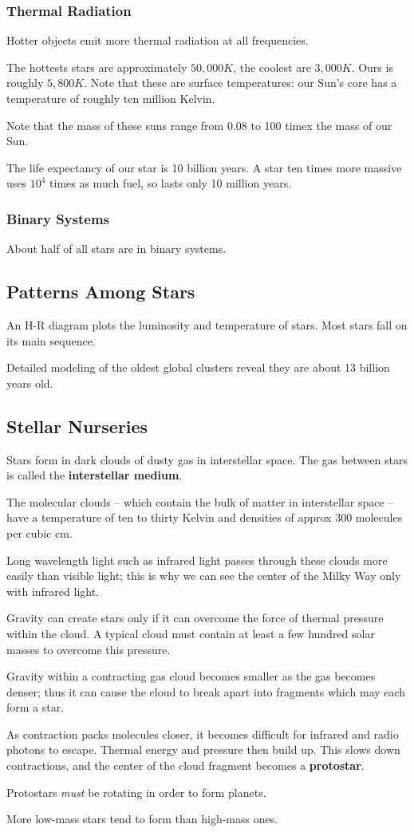 \documentclass[12pt]{article}
\begin{document}
\subsubsection{Thermal Radiation}
Hotter objects emit more thermal radiation at all frequencies.

The hottests stars are approximately $50,000K$, the coolest are $3,000K$. Ours is roughly $5,800K$. Note that these are surface temperatures: our Sun's core has a temperature of roughly ten million Kelvin.

Note that the mass of these suns range from 0.08 to 100 timex the mass of our Sun.

The life expectancy of our star is 10 billion years. A star ten times more massive uses $10^4$ times as much fuel, so lasts only 10 million years.

\subsubsection{Binary Systems}
About half of all stars are in binary systems.

\subsection{Patterns Among Stars}
An H-R diagram plots the luminosity and temperature of stars. Most stars fall on its main sequence.

Detailed modeling of the oldest global clusters reveal they are about 13 billion years old.

\subsection{Stellar Nurseries}
Stars form in dark clouds of dusty gas in interstellar space. The gas between stars is called the {\bf interstellar medium}.

The molecular clouds -- which contain the bulk of matter in interstellar space -- have a temperature of ten to thirty Kelvin and densities of approx 300 molecules per cubic cm.

Long wavelength light such as infrared light passes through these clouds more easily than visible light; this is why we can see the center of the Milky Way only with infrared light.

Gravity can create stars only if it can overcome the force of thermal pressure within the cloud. A typical cloud must contain at least a few hundred solar masses to overcome this pressure.

Gravity within a contracting gas cloud becomes smaller as the gas becomes denser; thus it can cause the cloud to break apart into fragments which may each form a star.

As contraction packs molecules closer, it becomes difficult for infrared and radio photons to escape. Thermal energy and pressure then build up. This slows down contractions, and the center of the cloud fragment becomes a {\bf protostar}.

Protostars \emph{must} be rotating in order to form planets.

More low-mass stars tend to form than high-mass ones.
\end{document}
